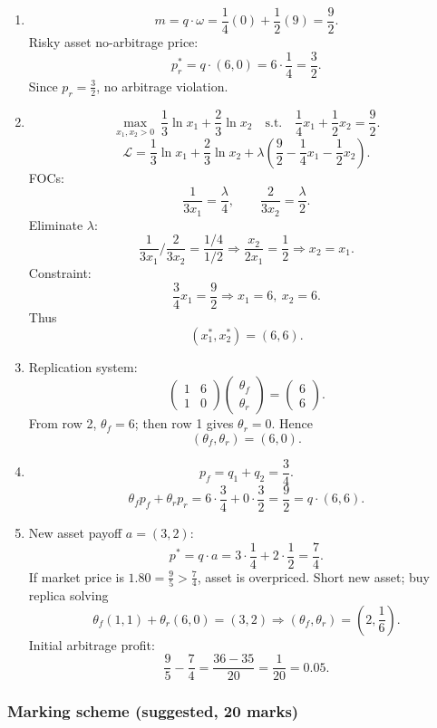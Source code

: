 \documentclass[12pt]{article}
\begin{document}
\begin{enumerate}[label=(\alph*)]
\item
\[
m=q\cdot \omega=\frac14(0)+\frac12(9)=\frac92.
\]
Risky asset no-arbitrage price:
\[
p_r^*=q\cdot(6,0)=6\cdot\frac14=\frac32.
\]
Since \(p_r=\frac32\), no arbitrage violation.

\item
\[
\max_{x_1,x_2>0}\ \frac13\ln x_1+\frac23\ln x_2
\quad\text{s.t.}\quad
\frac14x_1+\frac12x_2=\frac92.
\]
\[
\mathcal L=\frac13\ln x_1+\frac23\ln x_2+\lambda\!\left(\frac92-\frac14x_1-\frac12x_2\right).
\]
FOCs:
\[
\frac{1}{3x_1}=\frac{\lambda}{4},\qquad
\frac{2}{3x_2}=\frac{\lambda}{2}.
\]
Eliminate \(\lambda\):
\[
\frac{1}{3x_1}\Big/\frac{2}{3x_2}=\frac{1/4}{1/2}
\Rightarrow \frac{x_2}{2x_1}=\frac12
\Rightarrow x_2=x_1.
\]
Constraint:
\[
\frac34x_1=\frac92 \Rightarrow x_1=6,\ x_2=6.
\]
Thus
\[
\boxed{(x_1^*,x_2^*)=(6,6).}
\]

\item Replication system:
\[
\begin{pmatrix}
1&6\\
1&0
\end{pmatrix}
\begin{pmatrix}
\theta_f\\ \theta_r
\end{pmatrix}
=
\begin{pmatrix}
6\\6
\end{pmatrix}.
\]
From row 2, \(\theta_f=6\); then row 1 gives \(\theta_r=0\). Hence
\[
\boxed{(\theta_f,\theta_r)=(6,0).}
\]

\item
\[
p_f=q_1+q_2=\frac34.
\]
\[
\theta_fp_f+\theta_rp_r=6\cdot\frac34+0\cdot\frac32=\frac92
=q\cdot(6,6).
\]

\item New asset payoff \(a=(3,2)\):
\[
p^*=q\cdot a=3\cdot\frac14+2\cdot\frac12=\frac74.
\]
If market price is \(1.80=\frac95>\frac74\), asset is overpriced.  
Short new asset; buy replica solving
\[
\theta_f(1,1)+\theta_r(6,0)=(3,2)
\Rightarrow (\theta_f,\theta_r)=\left(2,\frac16\right).
\]
Initial arbitrage profit:
\[
\frac95-\frac74=\frac{36-35}{20}=\boxed{\frac1{20}=0.05}.
\]
\end{enumerate}


\subsubsection*{Marking scheme (suggested, 20 marks)}
\end{document}
